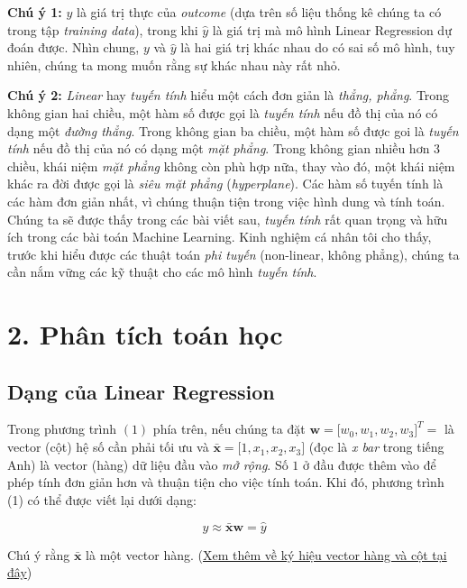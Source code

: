 \textbf{Chú ý 1:} $y$ là giá trị thực
của \emph{outcome} (dựa trên số liệu thống kê chúng ta có trong tập
\emph{training data}), trong khi
$\hat{y}$ là giá trị mà mô hình Linear
Regression dự đoán được. Nhìn chung, $y$
và $\hat{y}$ là hai giá trị khác nhau do
có sai số mô hình, tuy nhiên, chúng ta mong muốn rằng sự khác nhau này
rất nhỏ.

\textbf{Chú ý 2:} \emph{Linear} hay \emph{tuyến tính} hiểu một cách đơn
giản là \emph{thẳng, phẳng}. Trong không gian hai chiều, một hàm số được
gọi là \emph{tuyến tính} nếu đồ thị của nó có dạng một \emph{đường
thẳng}. Trong không gian ba chiều, một hàm số được goi là \emph{tuyến
tính} nếu đồ thị của nó có dạng một \emph{mặt phẳng}. Trong không gian
nhiều hơn 3 chiều, khái niệm \emph{mặt phẳng} không còn phù hợp nữa,
thay vào đó, một khái niệm khác ra đời được gọi là \emph{siêu mặt phẳng}
(\emph{hyperplane}). Các hàm số tuyến tính là các hàm đơn giản nhất, vì
chúng thuận tiện trong việc hình dung và tính toán. Chúng ta sẽ được
thấy trong các bài viết sau, \emph{tuyến tính} rất quan trọng và hữu ích
trong các bài toán Machine Learning. Kinh nghiệm cá nhân tôi cho thấy,
trước khi hiểu được các thuật toán \emph{phi tuyến} (non-linear, không
phẳng), chúng ta cần nắm vững các kỹ thuật cho các mô hình \emph{tuyến
tính}.

\section{2. Phân tích toán
học}\label{phuxe2n-tuxedch-touxe1n-hux1ecdc}

\subsection{Dạng của Linear
Regression}\label{dux1ea1ng-cux1ee7a-linear-regression}

Trong phương trình $(1)$ phía trên, nếu
chúng ta đặt $\mathbf{w} = {[}w_0, w_1, w_2,
w_3{]}^T = $ là vector (cột) hệ số cần phải tối ưu
và $\mathbf{\bar{x}} = {[}1, x_1, x_2,
x_3{]}$ (đọc là \emph{x bar} trong tiếng Anh) là vector
(hàng) dữ liệu đầu vào \emph{mở rộng}. Số
$1$ ở đầu được thêm vào để phép tính đơn
giản hơn và thuận tiện cho việc tính toán. Khi đó, phương trình (1) có
thể được viết lại dưới dạng:

\begin{equation}y \approx \mathbf{\bar{x}}\mathbf{w} =
\hat{y}\end{equation}

Chú ý rằng $\mathbf{\bar{x}}$ là một
vector hàng. (\href{/math/\#luu-y-ve-ky-hieu}{Xem thêm về ký hiệu vector
hàng và cột tại đây})

